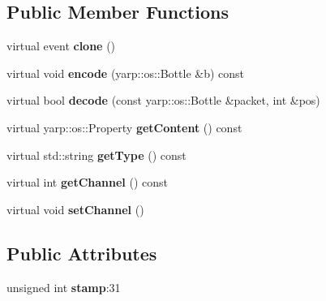 \subsection*{Public Member Functions}
\begin{DoxyCompactItemize}
\item 
virtual event {\bfseries clone} ()\hypertarget{classev_1_1vEvent_a44f88f43a5c6b5aa6d93001a11f9309b}{}\label{classev_1_1vEvent_a44f88f43a5c6b5aa6d93001a11f9309b}

\item 
virtual void {\bfseries encode} (yarp\+::os\+::\+Bottle \&b) const \hypertarget{classev_1_1vEvent_a66d9e4d833031c146cc0ac3af332b1cc}{}\label{classev_1_1vEvent_a66d9e4d833031c146cc0ac3af332b1cc}

\item 
virtual bool {\bfseries decode} (const yarp\+::os\+::\+Bottle \&packet, int \&pos)\hypertarget{classev_1_1vEvent_a75132601bf3f958212fd3793b7e53139}{}\label{classev_1_1vEvent_a75132601bf3f958212fd3793b7e53139}

\item 
virtual yarp\+::os\+::\+Property {\bfseries get\+Content} () const \hypertarget{classev_1_1vEvent_adabb906a71f96c89d6d539c899044622}{}\label{classev_1_1vEvent_adabb906a71f96c89d6d539c899044622}

\item 
virtual std\+::string {\bfseries get\+Type} () const \hypertarget{classev_1_1vEvent_a90411228dd74d994854b501b7cae7ff1}{}\label{classev_1_1vEvent_a90411228dd74d994854b501b7cae7ff1}

\item 
virtual int {\bfseries get\+Channel} () const \hypertarget{classev_1_1vEvent_a8ddb67938981d00a7275417e511ad3a5}{}\label{classev_1_1vEvent_a8ddb67938981d00a7275417e511ad3a5}

\item 
virtual void {\bfseries set\+Channel} ()\hypertarget{classev_1_1vEvent_a2cf5bf1d01ad2757a82b6e07d7e2a5da}{}\label{classev_1_1vEvent_a2cf5bf1d01ad2757a82b6e07d7e2a5da}

\end{DoxyCompactItemize}
\subsection*{Public Attributes}
\begin{DoxyCompactItemize}
\item 
unsigned int {\bfseries stamp}\+:31\hypertarget{classev_1_1vEvent_ad4e003653fa59b37682addefce835490}{}\label{classev_1_1vEvent_ad4e003653fa59b37682addefce835490}

\end{DoxyCompactItemize}
